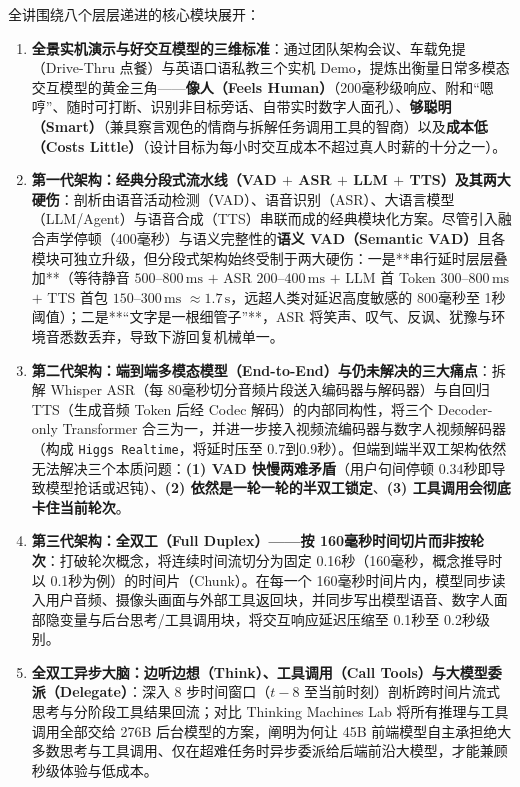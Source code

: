 \documentclass[a4paper]{article}
\begin{document}
全讲围绕八个层层递进的核心模块展开：
\begin{enumerate}
    \item \textbf{全景实机演示与好交互模型的三维标准}：通过团队架构会议、车载免提（Drive-Thru 点餐）与英语口语私教三个实机 Demo，提炼出衡量日常多模态交互模型的黄金三角——\textbf{像人（Feels Human）}（200毫秒级响应、附和“嗯哼”、随时可打断、识别非目标旁话、自带实时数字人面孔）、\textbf{够聪明（Smart）}（兼具察言观色的情商与拆解任务调用工具的智商）以及\textbf{成本低（Costs Little）}（设计目标为每小时交互成本不超过真人时薪的十分之一）。
    \item \textbf{第一代架构：经典分段式流水线（VAD $+$ ASR $+$ LLM $+$ TTS）及其两大硬伤}：剖析由语音活动检测（VAD）、语音识别（ASR）、大语言模型（LLM/Agent）与语音合成（TTS）串联而成的经典模块化方案。尽管引入融合声学停顿（400毫秒）与语义完整性的\textbf{语义 VAD（Semantic VAD）}且各模块可独立升级，但分段式架构始终受制于两大硬伤：一是**串行延时层层叠加**（等待静音 $500\text{--}800\,\mathrm{ms}$ $+$ ASR $200\text{--}400\,\mathrm{ms}$ $+$ LLM 首 Token $300\text{--}800\,\mathrm{ms}$ $+$ TTS 首包 $150\text{--}300\,\mathrm{ms}$ $\approx 1.7\,\mathrm{s}$，远超人类对延迟高度敏感的 800毫秒至 1秒阈值）；二是**“文字是一根细管子”**，ASR 将笑声、叹气、反讽、犹豫与环境音悉数丢弃，导致下游回复机械单一。
    \item \textbf{第二代架构：端到端多模态模型（End-to-End）与仍未解决的三大痛点}：拆解 Whisper ASR（每 80毫秒切分音频片段送入编码器与解码器）与自回归 TTS（生成音频 Token 后经 Codec 解码）的内部同构性，将三个 Decoder-only Transformer 合三为一，并进一步接入视频流编码器与数字人视频解码器（构成 \texttt{Higgs Realtime}，将延时压至 0.7到0.9秒）。但端到端半双工架构依然无法解决三个本质问题：\textbf{(1) VAD 快慢两难矛盾}（用户句间停顿 0.34秒即导致模型抢话或迟钝）、\textbf{(2) 依然是一轮一轮的半双工锁定}、\textbf{(3) 工具调用会彻底卡住当前轮次}。
    \item \textbf{第三代架构：全双工（Full Duplex）——按 160毫秒时间切片而非按轮次}：打破轮次概念，将连续时间流切分为固定 0.16秒（160毫秒，概念推导时以 0.1秒为例）的时间片（Chunk）。在每一个 160毫秒时间片内，模型同步读入用户音频、摄像头画面与外部工具返回块，并同步写出模型语音、数字人面部隐变量与后台思考/工具调用块，将交互响应延迟压缩至 0.1秒至 0.2秒级别。
    \item \textbf{全双工异步大脑：边听边想（Think）、工具调用（Call Tools）与大模型委派（Delegate）}：深入 8 步时间窗口（$t-8$ 至当前时刻）剖析跨时间片流式思考与分阶段工具结果回流；对比 Thinking Machines Lab 将所有推理与工具调用全部交给 276B 后台模型的方案，阐明为何让 45B 前端模型自主承担绝大多数思考与工具调用、仅在超难任务时异步委派给后端前沿大模型，才能兼顾秒级体验与低成本。

\end{enumerate}
\end{document}
